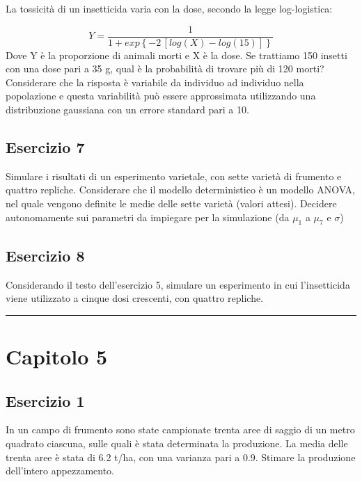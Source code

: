 \documentclass[a4paper,12pt,oneside]{book}
\begin{document}
La tossicità di un insetticida varia con la dose, secondo la legge log-logistica:

\[ Y = \frac{1}{1 + exp\left\{ -2 \, \left[log(X) - log(15)\right] \right\}}\] Dove Y è la proporzione di animali morti e X è la dose. Se trattiamo 150 insetti con una dose pari a 35 g, qual è la probabilità di trovare più di 120 morti? Considerare che la risposta è variabile da individuo ad individuo nella popolazione e questa variabilità può essere approssimata utilizzando una distribuzione gaussiana con un errore standard pari a 10.

\hypertarget{esercizio-7}{%
\subsection{Esercizio 7}\label{esercizio-7}}

Simulare i risultati di un esperimento varietale, con sette varietà di frumento e quattro repliche. Considerare che il modello deterministico è un modello ANOVA, nel quale vengono definite le medie delle sette varietà (valori attesi). Decidere autonomamente sui parametri da impiegare per la simulazione (da \(\mu_1\) a \(\mu_7\) e \(\sigma\))

\hypertarget{esercizio-8}{%
\subsection{Esercizio 8}\label{esercizio-8}}

Considerando il testo dell'esercizio 5, simulare un esperimento in cui l'insetticida viene utilizzato a cinque dosi crescenti, con quattro repliche.

\begin{center}\rule{0.5\linewidth}{0.5pt}\end{center}

\hypertarget{capitolo-5}{%
\section{Capitolo 5}\label{capitolo-5}}

\hypertarget{esercizio-1-3}{%
\subsection{Esercizio 1}\label{esercizio-1-3}}

In un campo di frumento sono state campionate trenta aree di saggio di un metro quadrato ciascuna, sulle quali è stata determinata la produzione. La media delle trenta aree è stata di 6.2 t/ha, con una varianza pari a 0.9. Stimare la produzione dell'intero appezzamento.
\end{document}
